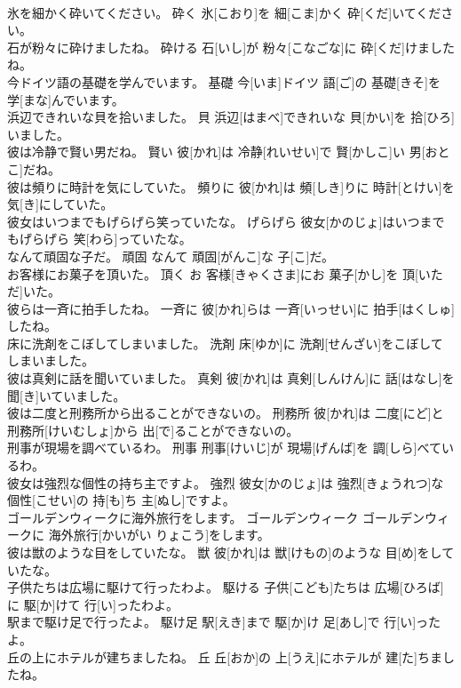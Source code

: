\documentclass[8pt]{extreport}
\begin{document}
\begin{CJK}{UTF8}{min}
\\	氷を細かく砕いてください。	砕く	氷[こおり]を 細[こま]かく 砕[くだ]いてください。	
\\	石が粉々に砕けましたね。	砕ける	石[いし]が 粉々[こなごな]に 砕[くだ]けましたね。	
\\	今ドイツ語の基礎を学んでいます。	基礎	今[いま]ドイツ 語[ご]の 基礎[きそ]を 学[まな]んでいます。	
\\	浜辺できれいな貝を拾いました。	貝	浜辺[はまべ]できれいな 貝[かい]を 拾[ひろ]いました。	
\\	彼は冷静で賢い男だね。	賢い	彼[かれ]は 冷静[れいせい]で 賢[かしこ]い 男[おとこ]だね。	
\\	彼は頻りに時計を気にしていた。	頻りに	彼[かれ]は 頻[しき]りに 時計[とけい]を 気[き]にしていた。	
\\	彼女はいつまでもげらげら笑っていたな。	げらげら	彼女[かのじょ]はいつまでもげらげら 笑[わら]っていたな。	
\\	なんて頑固な子だ。	頑固	なんて 頑固[がんこ]な 子[こ]だ。	
\\	お客様にお菓子を頂いた。	頂く	お 客様[きゃくさま]にお 菓子[かし]を 頂[いただ]いた。	
\\	彼らは一斉に拍手したね。	一斉に	彼[かれ]らは 一斉[いっせい]に 拍手[はくしゅ]したね。	
\\	床に洗剤をこぼしてしまいました。	洗剤	床[ゆか]に 洗剤[せんざい]をこぼしてしまいました。	
\\	彼は真剣に話を聞いていました。	真剣	彼[かれ]は 真剣[しんけん]に 話[はなし]を 聞[き]いていました。	
\\	彼は二度と刑務所から出ることができないの。	刑務所	彼[かれ]は 二度[にど]と 刑務所[けいむしょ]から 出[で]ることができないの。	
\\	刑事が現場を調べているわ。	刑事	刑事[けいじ]が 現場[げんば]を 調[しら]べているわ。	
\\	彼女は強烈な個性の持ち主ですよ。	強烈	彼女[かのじょ]は 強烈[きょうれつ]な 個性[こせい]の 持[も]ち 主[ぬし]ですよ。	
\\	ゴールデンウィークに海外旅行をします。	ゴールデンウィーク	ゴールデンウィークに 海外旅行[かいがい りょこう]をします。	
\\	彼は獣のような目をしていたな。	獣	彼[かれ]は 獣[けもの]のような 目[め]をしていたな。	
\\	子供たちは広場に駆けて行ったわよ。	駆ける	子供[こども]たちは 広場[ひろば]に 駆[か]けて 行[い]ったわよ。	
\\	駅まで駆け足で行ったよ。	駆け足	駅[えき]まで 駆[か]け 足[あし]で 行[い]ったよ。	
\\	丘の上にホテルが建ちましたね。	丘	丘[おか]の 上[うえ]にホテルが 建[た]ちましたね。	

\end{CJK}
\end{document}
